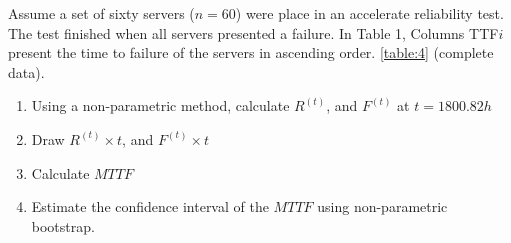 \documentclass{article}
\begin{document}
\setcounter{Question}{2}
\begin{question}
Assume a set of sixty servers ($n = 60$) were place in an accelerate reliability test. The test finished when all servers
presented a failure. In Table 1, Columns TTF$i$ present the time to failure of the servers in ascending order.
\ref{table:4} (complete data).
    \begin{enumerate}[label=(\alph*)]
        \item Using a non-parametric method, calculate $R^(t)$, and $F^(t)$ at $t = 1800.82h$
        \item  Draw $R^(t) \times t$, and $F^(t) \times t$
        \item  Calculate $MTTF$
        \item Estimate the confidence interval of the $MTTF$ using non-parametric bootstrap.
    \end{enumerate}
    
\end{question}
\end{document}
